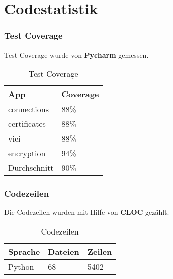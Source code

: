 \section{Codestatistik}
\subsubsection{Test Coverage}
Test Coverage wurde von \textbf{Pycharm} gemessen. \\

\begin{table}[H]
\centering
    \begin{tabular}{|p{6cm}|p{6cm}|}
    \hline    
    \rowcolor{lightblue}
	App & Coverage \\ \hline
	connections & 88\% \\ \hline    
	certificates & 88\% \\ \hline   
	vici & 88\% \\ \hline  
	encryption & 94\% \\ \hline  
	\rowcolor{lightblue}
	Durchschnitt &   90\% \\ \hline
    \end{tabular}
    \caption[Test Coverage]{Test Coverage}
\end{table}

\subsubsection{Codezeilen}
Die Codezeilen wurden mit Hilfe von \textbf{CLOC} \cite{CLOC} gezählt. \\

\begin{table}[H]
\centering
    \begin{tabular}{|p{3cm} |p{3cm} |p{3cm} |}
    \hline    
    \rowcolor{lightblue}
	Sprache & Dateien & Zeilen  \\ \hline   
	Python & 68 & 5402 \\ \hline
    \end{tabular}
    \caption[Codezeilen]{Codezeilen}
\end{table}

